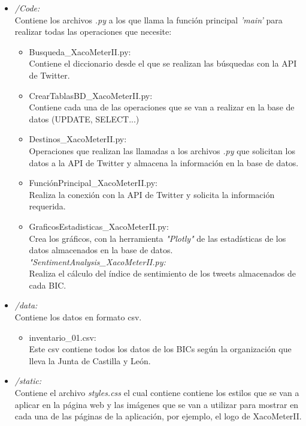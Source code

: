 \begin{itemize}
    \item \textit{/Code:}\\
    Contiene los archivos \textit{.py} a los que llama la función principal \textit{'main'} para realizar todas las operaciones que necesite:
    \begin{itemize}
        \item Busqueda\_XacoMeterII.py:\\
        Contiene el diccionario desde el que se realizan las búsquedas con la API de Twitter.
        \item CrearTablasBD\_XacoMeterII.py:\\
        Contiene cada una de las operaciones que se van a realizar en la base de datos (UPDATE, SELECT...)
        \item Destinos\_XacoMeterII.py:\\
        Operaciones que realizan las llamadas a los archivos \textit{.py} que solicitan los datos a la API de Twitter y almacena la información en la base de datos.
        \item FunciónPrincipal\_XacoMeterII.py:\\
        Realiza la conexión con la API de Twitter y solicita la información requerida.
        \item GraficosEstadisticas\_XacoMeterII.py:\\
        Crea los gráficos, con la herramienta \textit{"Plotly"} de las estadísticas de los datos almacenados en la base de datos.
        \textit{"SentimentAnalysis\_XacoMeterII.py:}\\
        Realiza el cálculo del índice de sentimiento de los tweets almacenados de cada BIC.
    \end{itemize}
    \item \textit{/data:}\\
    Contiene los datos en formato csv.
    \begin{itemize}
        \item inventario\_01.csv:\\
        Este csv contiene todos los datos de los BICs según la organización que lleva la Junta de Castilla y León.
    \end{itemize}
    \item \textit{/static:}\\
    Contiene el archivo \textit{styles.css} el cual contiene contiene los estilos que se van a aplicar en la página web y las imágenes que se van a utilizar para mostrar en cada una de las páginas de la aplicación, por ejemplo, el logo de XacoMeterII.

\end{itemize}
